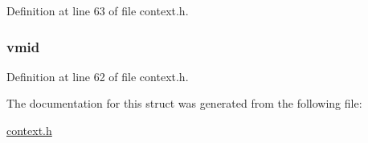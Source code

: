 \-Definition at line 63 of file context.\-h.

\hypertarget{structhyp__guest__context_a5aaea0584ec137718b51152ba747628b}{
\subsubsection[{vmid}]{ {\bf vmid}}}\label{structhyp__guest__context_a5aaea0584ec137718b51152ba747628b}


\-Definition at line 62 of file context.\-h.



\-The documentation for this struct was generated from the following file\-:\begin{DoxyCompactItemize}
\item 
\hyperlink{context_8h}{context.\-h}\end{DoxyCompactItemize}
